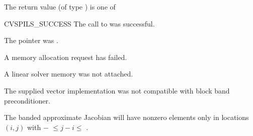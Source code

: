 {
  The return value  (of type ) is one of
  \begin{args}
  \item[CVSPILS\_SUCCESS]
    The call to  was successful.
  \item[\id{CVSPILS\_MEM\_NULL}] 
    The  pointer was .
  \item[\Id{CVSPILS\_MEM\_FAIL}]
    A memory allocation request has failed.
  \item[\Id{CVSPILS\_LMEM\_NULL}]
    A {\cvspils} linear solver memory was not attached.
  \item[\Id{CVSPILS\_ILL\_INPUT}]
    The supplied vector implementation was not compatible with block
    band preconditioner. 
  \end{args}
}
{
  The banded approximate Jacobian will have nonzero elements only in locations
  $(i,j)$ with $-$ $\leq j-i \leq$ .
}


